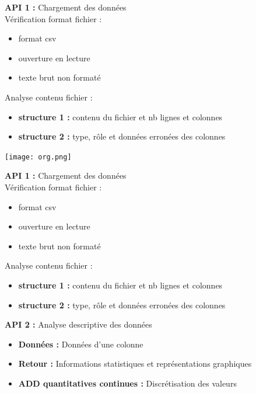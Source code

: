 	\begin{frame}
		\textbf{API 1 :} Chargement des données\\
		Vérification format fichier :
		\begin{itemize}
			\item format csv
			\item ouverture en lecture
			\item texte brut non formaté
		\end{itemize} \pause
		Analyse contenu fichier :
		\begin{itemize}
			\item \textbf{structure 1 :} contenu du fichier et nb lignes et colonnes
			\item \textbf{structure 2 :} type, rôle et données erronées des colonnes
		\end{itemize}		
	\end{frame}
	
	\begin{frame}
		\begin{center}\texttt{[image: org.png]}\end{center}
	\end{frame}
	
	\begin{frame}
		\textbf{API 1 :} Chargement des données\\
		Vérification format fichier :
		\begin{itemize}
			\item format csv
			\item ouverture en lecture
			\item texte brut non formaté
		\end{itemize}
		Analyse contenu fichier :
		\begin{itemize}
			\item \textbf{structure 1 :} contenu du fichier et nb lignes et colonnes
			\item \textbf{structure 2 :} type, rôle et données erronées des colonnes
		\end{itemize}
		
		\textbf{API 2 :} Analyse descriptive des données\\
		\begin{itemize}
			\item \textbf{Données :} Données d'une colonne
			\item \textbf{Retour :} Informations statistiques et représentations graphiques
			\item \textbf{ADD quantitatives continues :} Discrétisation des valeurs
		\end{itemize}	
	\end{frame}
	
